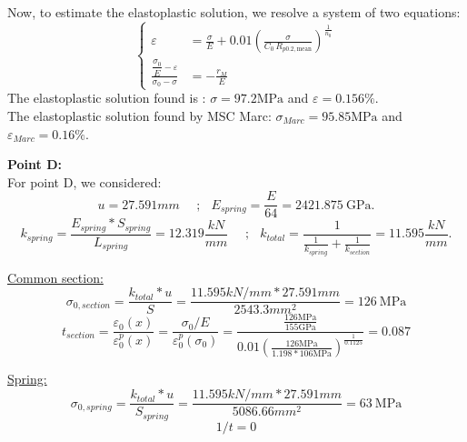 \documentclass[10pt,a4paper]{article}
\begin{document}
Now, to estimate the elastoplastic solution, we resolve a system of two equations:
\begin{equation*} 
\left\{ \begin{aligned} 
\varepsilon &= \frac{\sigma}{E} + 0.01 \left( \frac{\sigma}{C_0\,R_{p0.2,\mathrm{mean}}} \right)^{\frac{1}{n_0}} \\[1em]
\frac{\dfrac{\sigma_0}{E}-\varepsilon} {\sigma_0-\sigma} &= -\frac{r_M}{E} 
\end{aligned} \right.
\end{equation*}
The elastoplastic solution found is :  $\sigma=97.2\mathrm{MPa}$ and $\varepsilon=0.156 \%$. \\
The elastoplastic solution found by MSC Marc: $\sigma_{Marc}=95.85\mathrm{MPa}$ and $\varepsilon_{Marc}=0.16 \%$.


\newpage
\textbf{Point D:} \\
For point D, we considered:
\begin{equation*}
u=27.591mm \ \ \ \ \ \ \text{;} \ \ \ \ E_{spring}=\frac{E}{64}=2421.875 ~\mathrm{GPa}.
\end{equation*}
\begin{equation*}
k_{spring}=\frac{E_{spring}*S_{spring}}{L_{spring}}=12.319 \frac{kN}{mm} \ \ \ \ \ \ \text{;} \ \ \ \ k_{total}=\frac{1}{\frac{1}{k_{spring}}+\frac{1}{k_{section}}}=11.595 \frac{kN}{mm}.
\end{equation*}

\underline{Common section:} \\
\begin{equation*}
\sigma_{0,section} = \frac{k_{total}*u}{S} = \frac{11.595 kN/mm * 27.591mm}{2543.3 mm^2}=126~\mathrm{MPa}
\end{equation*}
\begin{equation*}
t_{section} = \frac{\varepsilon_0(x)}{\varepsilon_0^p(x)}=\frac{\sigma_0/E}{\varepsilon_0^p(\sigma_0)}=\frac{\frac{126\mathrm{MPa}}{155\mathrm{GPa}}}{0.01\left( \frac{126\mathrm{MPa}}{1.198*106\mathrm{MPa}} \right)^{\frac{1}{0.1125}}}=0.087
\end{equation*}



\underline{Spring:} \\
\begin{equation*}
\sigma_{0,spring} = \frac{k_{total}*u}{S_{spring}} = \frac{11.595 kN/mm * 27.591mm}{5086.66 mm^2}=63~\mathrm{MPa}
\end{equation*}
\begin{equation*}
1/t = 0
\end{equation*}
\end{document}
